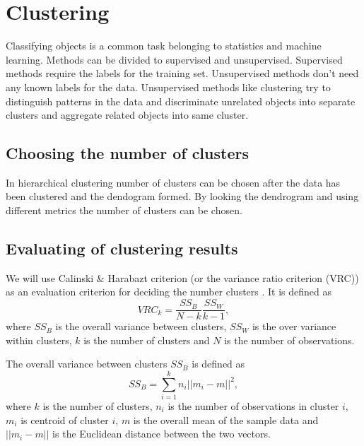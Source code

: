 \section{Clustering}
Classifying objects is a common task belonging to statistics and 
machine learning. Methods can be divided to supervised and 
unsupervised. Supervised methods require the labels for the training
set. Unsupervised methods don't need any known labels for the data.
Unsupervised methods like clustering try to distinguish patterns 
in the data and discriminate unrelated objects into separate 
clusters and aggregate related objects into same cluster.



\subsection{Choosing the number of clusters}

In hierarchical clustering number of clusters can be chosen after 
the data has been clustered and the dendogram 
 formed.
 By 
looking the dendrogram and using different metrics the number of 
clusters can be chosen.


\subsection{Evaluating of clustering results}
We will use Calinski \& Harabazt criterion (or the variance ratio 
criterion (VRC)) as an evaluation criterion for 
deciding the number clusters \cite{calinski_dendrite_1974}. It 
is defined as
\begin{equation}
 VRC_k = \frac{SS_B}{N-k} \frac{SS_W}{k-1},
\end{equation}
where $SS_B$ is the overall variance between clusters, $SS_W$ is 
the over variance within clusters, $k$ is the number of clusters 
and $N$ is the number of observations.

The overall variance between clusters $SS_B$ is defined as
\begin{equation}
 SS_B = \sum_{i=1}^k n_i ||m_i-m||^2,
\end{equation}
where $k$ is the number of clusters, $n_i$ is the number of 
observations in cluster $i$, $m_i$ is centroid of cluster $i$, 
$m$ is the overall mean of the sample data and $||m_i-m||$ is the 
Euclidean distance between the two vectors.

